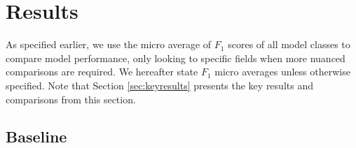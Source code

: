\section{Results}
\label{sec:results}

As specified earlier, we use the micro average of $F_1$ scores of all model classes to compare model performance, only looking to specific fields when more nuanced comparisons are required. We hereafter state $F_1$ micro averages unless otherwise specified. Note that Section \ref{sec:keyresults} presents the key results and comparisons from this section.

\subsection{Baseline}
\label{subsec:baslineresults}

